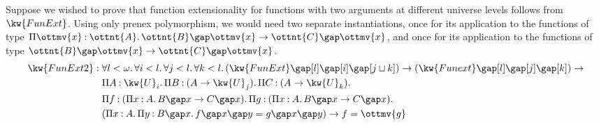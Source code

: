 \documentclass[a4paper,UKenglish,cleveref,autoref,thm-restate]{lipics-v2021}
\begin{document}
Suppose we wished to prove that function extensionality for
functions with two arguments at different universe levels follows from $ \kw{ FunExt } $.
Using only prenex polymorphism, we would need two separate instantiations,
once for its application to the functions of type $ \Pi  \ottmv{x}  \mathbin{:}  \ottnt{A}  \mathpunct{.}     \ottnt{B}  \gap  \ottmv{x}   \to  \ottnt{C}   \gap  \ottmv{x}  $,
and once for its application to the functions of type $   \ottnt{B}  \gap  \ottmv{x}   \to  \ottnt{C}   \gap  \ottmv{x} $.
%
\begin{align*}
   \kw{ FunExt2 }  &:    \forall  l  <   \omega   \mathpunct{.}   \forall  i  <  l  \mathpunct{.}   \forall  j  <  l  \mathpunct{.}   \forall  k  <  l  \mathpunct{.}   (     \kw{ FunExt }   \gap [  l  ]   \gap [  i  ]   \gap [   j  \sqcup  k   ]  )       \to   (     \kw{ Funext }   \gap [  l  ]   \gap [  j  ]   \gap [  k  ]  )    \to   \relax   \\
  &\phantom{{} : {}}  \Pi  A  \mathbin{:}   \kw{U}_{ i }   \mathpunct{.}   \Pi  B  \mathbin{:}   (  A  \to   \kw{U}_{ j }   )   \mathpunct{.}   \Pi  C  \mathbin{:}   (  A  \to   \kw{U}_{ k }   )   \mathpunct{.}   \relax     \\
  &\phantom{{} : {}}  \Pi  f  \mathbin{:}   (     \Pi  x  \mathbin{:}  A  \mathpunct{.}  B   \gap  x   \to  C   \gap  x  )   \mathpunct{.}   \Pi  g  \mathbin{:}   (     \Pi  x  \mathbin{:}  A  \mathpunct{.}  B   \gap  x   \to  C   \gap  x  )   \mathpunct{.}   \relax    \\
  &\phantom{{} : {}}   (       \Pi  x  \mathbin{:}  A  \mathpunct{.}   \Pi  y  \mathbin{:}   B  \gap  x   \mathpunct{.}  f    \gap  x   \gap  y   =  g   \gap  x   \gap  y  )   \to    f  =  \ottmv{g}   
\end{align*}
\end{document}
